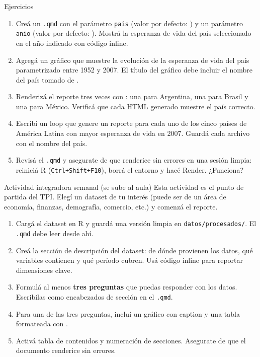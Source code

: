 \documentclass[8pt]{beamer}
\begin{document}
	\begin{frame}[fragile]{Ejercicios}
		\begin{enumerate}
			\item Creá un \texttt{.qmd} con el parámetro \texttt{pais} (valor por defecto: ) y un parámetro \texttt{anio} (valor por defecto: ). Mostrá la esperanza de vida del país seleccionado en el año indicado con código inline.

			\item Agregá un gráfico que muestre la evolución de la esperanza de vida del país parametrizado entre 1952 y 2007. El título del gráfico debe incluir el nombre del país tomado de .

			\item Renderizá el reporte tres veces con : una para Argentina, una para Brasil y una para México. Verificá que cada HTML generado muestre el país correcto.

			\item Escribí un loop que genere un reporte para cada uno de los cinco países de América Latina con mayor esperanza de vida en 2007. Guardá cada archivo con el nombre del país.

			\item Revisá el \texttt{.qmd} y asegurate de que renderice sin errores en una sesión limpia: reiniciá R (\verb|Ctrl+Shift+F10|), borrá el entorno y hacé Render. ¿Funciona?
		\end{enumerate}
	\end{frame}


	\begin{frame}[fragile]{Actividad integradora semanal (se sube al aula)}
		Esta actividad es el punto de partida del TPI. Elegí un dataset de tu interés (puede ser de un área de economía, finanzas, demografía, comercio, etc.) y comenzá el reporte.

		\begin{enumerate}
			\item Cargá el dataset en R y guardá una versión limpia en \texttt{datos/procesados/}. El \texttt{.qmd} debe leer desde ahí.

			\item Creá la sección de descripción del dataset: de dónde provienen los datos, qué variables contienen y qué período cubren. Usá código inline para reportar dimensiones clave.

			\item Formulá al menos \textbf{tres preguntas} que puedas responder con los datos. Escribilas como encabezados de sección en el \texttt{.qmd}.

			\item Para una de las tres preguntas, incluí un gráfico con caption y una tabla formateada con .

			\item Activá tabla de contenidos y numeración de secciones. Asegurate de que el documento renderice sin errores.
		\end{enumerate}
	\end{frame}
\end{document}
